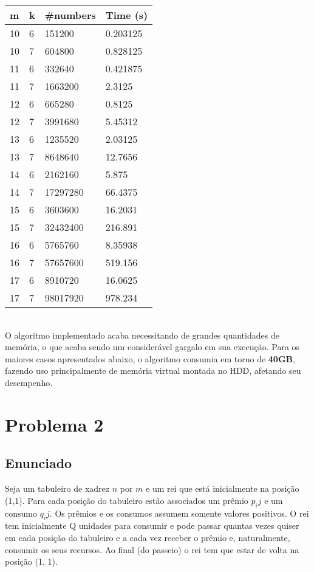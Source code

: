 \documentclass[twoside]{article}
\begin{document}
\begin{multicols}{2}
\begin{tabular}{llll}
  \toprule
  \textbf{m}  &  \textbf{k} &   \textbf{\#numbers} &  \textbf{Time (s)} \\
  \midrule
  10 &  6 &   151200    &   0.203125  \\
  10 &  7 &   604800    &   0.828125  \\
  11 &  6 &   332640    &   0.421875  \\
  11 &  7 &   1663200   &   2.3125    \\
  12 &  6 &   665280    &   0.8125    \\
  12 &  7 &   3991680   &   5.45312   \\
  13 &  6 &   1235520   &   2.03125   \\
  13 &  7 &   8648640   &   12.7656   \\
  14 &  6 &   2162160   &   5.875     \\
  14 &  7 &   17297280  &   66.4375   \\
  15 &  6 &   3603600   &   16.2031   \\
  15 &  7 &   32432400  &   216.891   \\
  16 &  6 &   5765760   &   8.35938   \\
  16 &  7 &   57657600  &   519.156   \\
  17 &  6 &   8910720   &   16.0625   \\
  17 &  7 &   98017920  &   978.234   \\
  \bottomrule 
\end{tabular}\\
\newline\newline
\indent O algoritmo implementado acaba necessitando de grandes quantidades de memória, o que acaba sendo um considerável gargalo em sua execução. Para os maiores casos apresentados abaixo, o algoritmo consumia em torno de \textbf{40GB}, fazendo uso principalmente de memória virtual montada no HDD, afetando seu desempenho.

\newpage
\section{Problema 2}

\subsection{ Enunciado }
\indent Seja um tabuleiro de xadrez $n$ por $m$ e um rei que está inicialmente na posição (1,1). Para cada posição do tabuleiro estão associados um prêmio $p_ij$ e um consumo $q_ij$. Os prêmios e os consumos assumem somente valores positivos.
O rei tem inicialmente Q unidades para consumir e pode passar quantas vezes quiser em cada
posição do tabuleiro e a cada vez receber o prêmio e, naturalmente, consumir os seus recursos. Ao final (do passeio) o rei tem que estar de volta na posição (1, 1).\\


\end{multicols}
\end{document}
